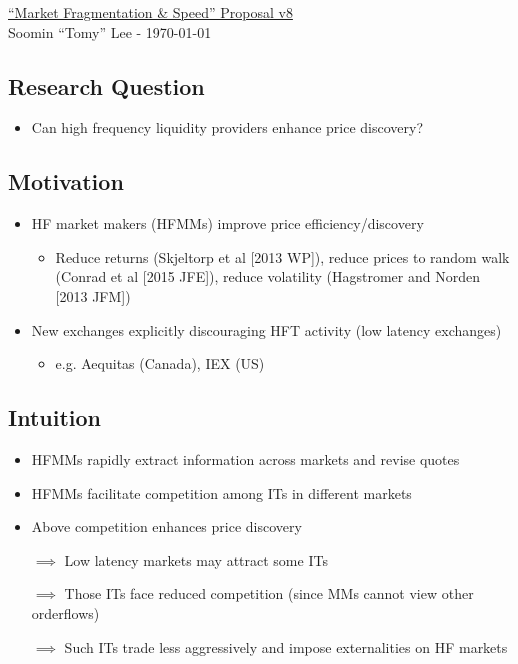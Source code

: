 \documentclass{scrartcl}
\begin{document}
			\begin{center}
				\huge
				\underline{``Market Fragmentation \& Speed'' Proposal v8} \\
				\LARGE
				Soomin ``Tomy'' Lee - \today
			\end{center}

			\subsection*{Research Question}
			\begin{itemize}\itemsep.1em
				\item Can high frequency liquidity providers enhance price discovery?
			\end{itemize}

			\subsection*{Motivation}
			\begin{itemize}\itemsep.1em
				\item HF market makers (HFMMs) improve price efficiency/discovery
				\begin{itemize}
					\item Reduce returns (Skjeltorp et al [2013 WP]), reduce prices to random walk (Conrad et al [2015 JFE]), reduce volatility (Hagstromer and Norden [2013 JFM])
				\end{itemize}
				\item New exchanges explicitly discouraging HFT activity (low latency exchanges)
				\begin{itemize}
					\item e.g. Aequitas (Canada), IEX (US)
				\end{itemize}
			\end{itemize}

			\subsection*{Intuition}
			\begin{itemize}\itemsep.1em
				\item HFMMs rapidly extract information across markets and revise quotes
				\item HFMMs facilitate competition among ITs in different markets
				\item Above competition enhances price discovery
				\item[$\implies$] Low latency markets may attract some ITs
				\item[$\implies$] Those ITs face reduced competition (since MMs cannot view other orderflows)
				\item[$\implies$] Such ITs trade less aggressively and impose externalities on HF markets
			\end{itemize}
\end{document}
